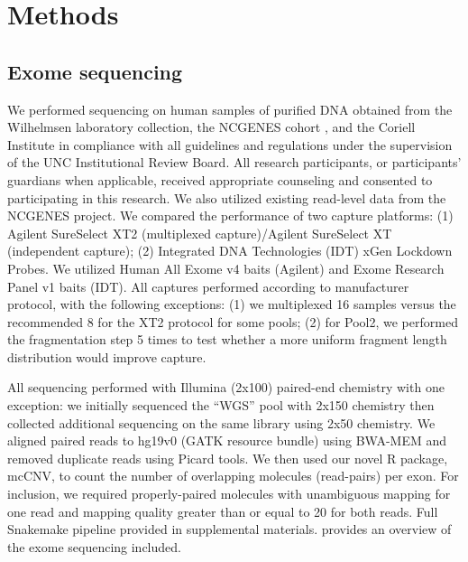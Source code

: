 \documentclass{bmcart}\usepackage[]{graphicx}\usepackage[]{color}
\begin{document}

\section{Methods}

\subsection{Exome sequencing}

We performed sequencing on human samples of purified DNA obtained from the Wilhelmsen laboratory collection, the NCGENES cohort \cite{foreman:2013aa}, and the Coriell Institute in compliance with all guidelines and regulations under the supervision of the UNC Institutional Review Board.
All research participants, or participants' guardians when applicable, received appropriate counseling and consented to participating in this research.
We also utilized existing read-level data from the NCGENES \cite{foreman:2013aa} project.
We compared the performance of two capture platforms: (1) Agilent SureSelect XT2 (multiplexed capture)/Agilent SureSelect XT (independent capture); (2) Integrated DNA Technologies (IDT) xGen Lockdown Probes.
We utilized Human All Exome v4 baits (Agilent) and Exome Research Panel v1 baits (IDT).
All captures performed according to manufacturer protocol, with the following exceptions: (1) we multiplexed 16 samples versus the recommended 8 for the XT2 protocol for some pools; (2) for Pool2, we performed the fragmentation step 5 times to test whether a more uniform fragment length distribution would improve capture.

All sequencing performed with Illumina (2x100) paired-end chemistry with one exception: we initially sequenced the ``WGS'' pool with 2x150 chemistry then collected additional sequencing on the same library using 2x50 chemistry.
We aligned paired reads to hg19v0 (GATK resource bundle) using BWA-MEM \cite{li:2013ab} and removed duplicate reads using Picard tools.
We then used our novel R package, mcCNV, to count the number of overlapping molecules (read-pairs) per exon.
For inclusion, we required properly-paired molecules with unambiguous mapping for one read and mapping quality greater than or equal to 20 for both reads.
Full Snakemake \cite{koster:2012aa} pipeline provided in supplemental materials.
 provides an overview of the exome sequencing included.
\end{document}
